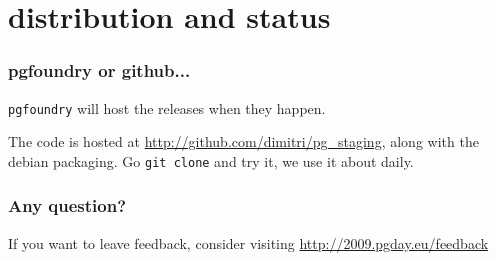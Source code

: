 \documentclass{beamer}
\begin{document}
\section{distribution and status}

\begin{frame}[fragile]
  \frametitle{pgfoundry or github...}

  \texttt{pgfoundry} will host the releases when they happen.

  \linebreak
  \linebreak
  \pause

  The code is hosted at \url{http://github.com/dimitri/pg_staging}, along
  with the debian packaging. Go \texttt{git clone} and try it, we use it
  about daily.
\end{frame}

\begin{frame}[fragile]
  \frametitle{Any question?}


  \linebreak
  \pause

  \begin{center}
  If you want to leave feedback, consider visiting
  \url{http://2009.pgday.eu/feedback}
  \end{center}
\end{frame}
\end{document}
